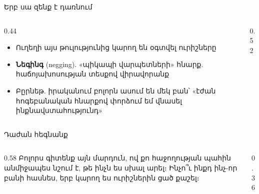 \begin{frame}{Երբ սա զենք է դառնում}
  \begin{columns}[c]
    \begin{column}{0.44\textwidth}
      \begin{itemize}
        \item Ուղեղի այս թուլությունից կարող են օգտվել ուրիշները
        \item<2-> \textbf{Նեգինգ} (negging). «պիկապի վարպետների» հնարք. հաճոյախոսության տեսքով վիրավորանք
        \item<5-> Բըրնեթ. իրականում բոլորն ասում են մեկ բան՝ «էժան հոգեբանական հնարքով փորձում եմ վնասել ինքնավստահությունդ»
      \end{itemize}
    \end{column}
    \begin{column}{0.52\textwidth}
      \centering
    \end{column}
  \end{columns}
\end{frame}

\begin{frame}{Դաժան հեգնանք}
  \begin{columns}[c]
    \begin{column}{0.58\textwidth}
      Բոլորս գիտենք այն մարդուն, ով քո հաջողության պահին անմիջապես նշում է, թե ինչն ես սխալ արել։ Ինչո՞ւ ինքդ ինչ-որ բանի հասնես, երբ կարող ես ուրիշներին ցած քաշել։\par\medskip
    \end{column}
    \begin{column}{0.36\textwidth}
      \centering
    \end{column}
  \end{columns}
\end{frame}
